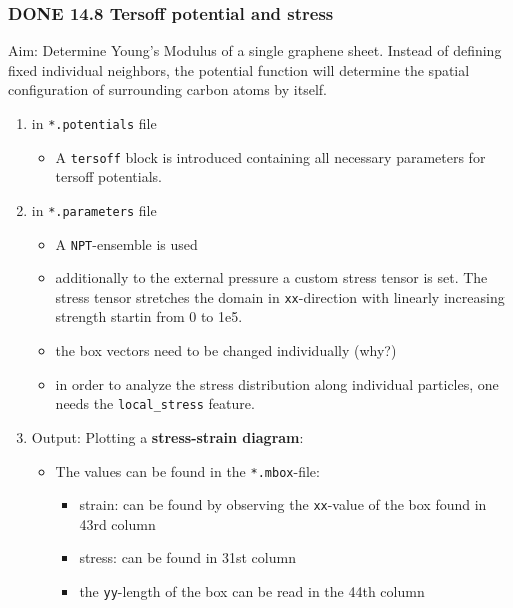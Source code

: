 \documentclass[11pt]{article}
\begin{document}
\subsubsection{\textbf{DONE} 14.8 Tersoff potential and stress}
\label{sec-2.4.8}


Aim: Determine Young's Modulus of a single graphene sheet. Instead of defining fixed individual neighbors, the potential function will determine the spatial configuration of surrounding carbon atoms by itself. 

\begin{enumerate}
\item in \texttt{*.potentials} file

\begin{itemize}
\item A \texttt{tersoff} block is introduced containing all necessary parameters for tersoff potentials.
\end{itemize}

\item in \texttt{*.parameters} file

\begin{itemize}
\item A \texttt{NPT}-ensemble is used
\item additionally to the external pressure a custom stress tensor is set. The stress tensor stretches the domain in \texttt{xx}-direction with linearly increasing strength startin from 0 to 1e5.
\item the box vectors need to be changed individually (why?)
\item in order to analyze the stress distribution along individual particles, one needs the \texttt{local\_stress} feature.
\end{itemize}

\item Output: Plotting a \textbf{stress-strain diagram}:

\begin{itemize}
\item The values can be found in the \texttt{*.mbox}-file:

\begin{itemize}
\item strain: can be found by observing the \texttt{xx}-value of the box found in 43rd column
\item stress: can be found in 31st column
\item the \texttt{yy}-length of the box can be read in the 44th column
\end{itemize}

\end{itemize}

\end{enumerate}
\end{document}
